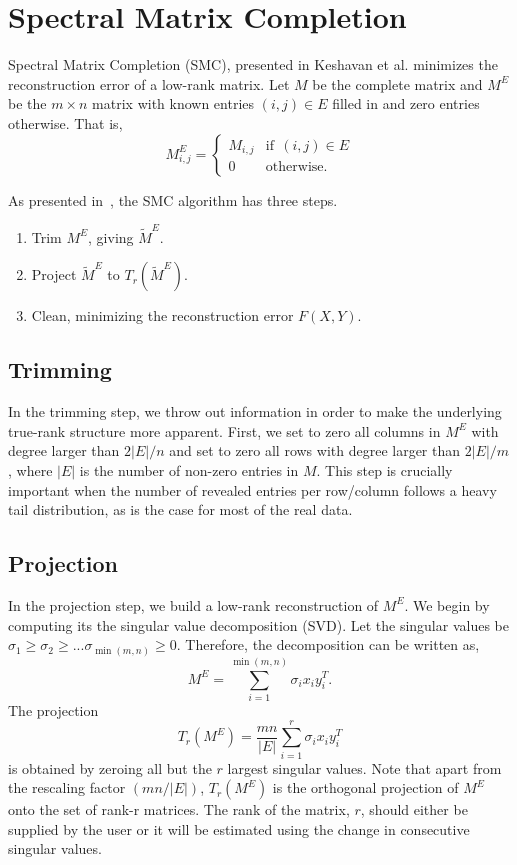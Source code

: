 \documentclass{article} %
\begin{document}
\section{Spectral Matrix Completion}

Spectral Matrix Completion (SMC), presented in Keshavan et al.
\cite{keshavan2010matrix} minimizes the reconstruction error of a
low-rank matrix. Let $M$ be the complete matrix and $M^E$ be the
$m \times n$ matrix with known entries $(i,j) \in E$ filled in and
zero entries otherwise. That is,
\begin{equation}
M^E_{i,j} = \begin{cases}
    M_{i,j} & \text{if} \ \  (i,j) \in E \\
    0      & \text{otherwise}.
   \end{cases}
\end{equation}

As presented in~\cite{keshavan2010matrix}, the SMC algorithm has three
steps.
\begin{enumerate}
\item Trim $M^E$, giving $\widetilde{M}^E$.
\item Project $\widetilde{M}^E$ to $T_r(\widetilde{M}^E)$.
\item Clean, minimizing the reconstruction error $F(X,Y)$.
\end{enumerate}

\subsection{Trimming}
In the trimming step, we throw out information in order to make the
underlying true-rank structure more apparent. First, we set to zero
all columns in $M^E$ with degree larger than $2|E|/n$ and set to zero
all rows with degree larger than $2|E|/m$, where $|E|$ is the number
of non-zero entries in $M$. This step is crucially important when the
number of revealed entries per row/column follows a heavy tail
distribution, as is the case for most of the real data.

\subsection{Projection}
In the projection step, we build a low-rank reconstruction of $M^E$.
We begin by computing its the singular value decomposition (SVD). Let
the singular values be
$\sigma_1 \ge \sigma_2 \ge ... \sigma_{\min(m,n)} \ge 0$. Therefore,
the decomposition can be written as,
\begin{equation}
  M^E = \sum_{i=1}^{\min(m,n)} \sigma_ix_iy_i^T.
\end{equation}
The projection
\begin{equation}
  T_r(M^E) = \frac{mn}{|E|}\sum\limits_{i=1}^r \sigma_ix_iy_i^T
\end{equation}
is obtained by zeroing all but the $r$ largest singular values. Note
that apart from the rescaling factor $(mn/|E|)$, $T_r(M^E)$ is the
orthogonal projection of $M^E$ onto the set of rank-r matrices. The rank of the matrix, $r$, should either be supplied by the user or it will be estimated using the change in consecutive singular values.
\end{document}
